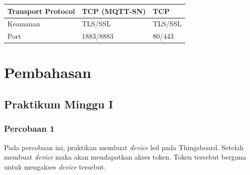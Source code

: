 \documentclass{class}
\begin{document}
\begin{table}[H]
\begin{tabular}{|l|l|l|}
  Transport Protocol                                     & TCP (MQTT-SN)                                                                                          & TCP                                                                                                    \\ \hline
  Keamanan                                               & TLS/SSL                                                                                                & TLS/SSL                                                                                                \\ \hline
  Port                                                   & 1883/8883                                                                                              & 80/443                                                                                                 \\ \hline
  \end{tabular}
  \end{table} 

    \chapter{Pembahasan}
  \section{Praktikum Minggu I}
    \subsection{Percobaan 1}
    Pada percobaan ini, praktikan membuat \emph{device} led pada Thingsboard.
    Setelah membuat \emph{device} maka akan mendapatkan akses token.
    Token tersebut berguna untuk mengakses \emph{device} tersebut.
\end{document}
